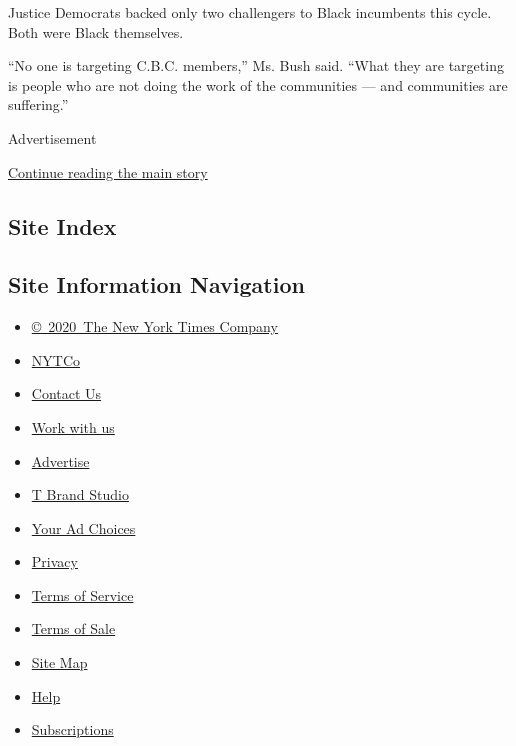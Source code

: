Justice Democrats backed only two challengers to Black incumbents this
cycle. Both were Black themselves.

``No one is targeting C.B.C. members,'' Ms. Bush said. ``What they are
targeting is people who are not doing the work of the communities ---
and communities are suffering.''

Advertisement

\protect\hyperlink{after-bottom}{Continue reading the main story}

\hypertarget{site-index}{%
\subsection{Site Index}\label{site-index}}

\hypertarget{site-information-navigation}{%
\subsection{Site Information
Navigation}\label{site-information-navigation}}

\begin{itemize}
\tightlist
\item
  \href{https://help.nytimes3xbfgragh.onion/hc/en-us/articles/115014792127-Copyright-notice}{©~2020~The
  New York Times Company}
\end{itemize}

\begin{itemize}
\tightlist
\item
  \href{https://www.nytco.com/}{NYTCo}
\item
  \href{https://help.nytimes3xbfgragh.onion/hc/en-us/articles/115015385887-Contact-Us}{Contact
  Us}
\item
  \href{https://www.nytco.com/careers/}{Work with us}
\item
  \href{https://nytmediakit.com/}{Advertise}
\item
  \href{http://www.tbrandstudio.com/}{T Brand Studio}
\item
  \href{https://www.nytimes3xbfgragh.onion/privacy/cookie-policy\#how-do-i-manage-trackers}{Your
  Ad Choices}
\item
  \href{https://www.nytimes3xbfgragh.onion/privacy}{Privacy}
\item
  \href{https://help.nytimes3xbfgragh.onion/hc/en-us/articles/115014893428-Terms-of-service}{Terms
  of Service}
\item
  \href{https://help.nytimes3xbfgragh.onion/hc/en-us/articles/115014893968-Terms-of-sale}{Terms
  of Sale}
\item
  \href{https://spiderbites.nytimes3xbfgragh.onion}{Site Map}
\item
  \href{https://help.nytimes3xbfgragh.onion/hc/en-us}{Help}
\item
  \href{https://www.nytimes3xbfgragh.onion/subscription?campaignId=37WXW}{Subscriptions}
\end{itemize}
